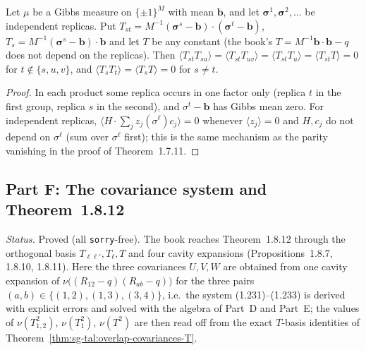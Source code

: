 \begin{theorem}
\label{thm:sg-tal:T-orthogonality}
  \leanok
{}
Let $\mu$ be a Gibbs measure on $\{\pm1\}^M$ with mean $\mathbf b$, and let $\boldsymbol\sigma^1,\boldsymbol\sigma^2,\dots$ be independent replicas.  Put $T_{st}=M^{-1}(\boldsymbol\sigma^s-\mathbf b)\cdot(\boldsymbol\sigma^t-\mathbf b)$, $T_s=M^{-1}(\boldsymbol\sigma^s-\mathbf b)\cdot\mathbf b$ and let $T$ be any constant (the book's $T=M^{-1}\mathbf b\cdot\mathbf b-q$ does not depend on the replicas).  Then
$\langle T_{st}T_{su}\rangle=\langle T_{st}T_{uv}\rangle=\langle T_{st}T_u\rangle=\langle T_{st}T\rangle=0$ for $t\notin\{s,u,v\}$, and $\langle T_sT_t\rangle=\langle T_sT\rangle=0$ for $s\ne t$.
\end{theorem}
\begin{proof}
  \leanok
In each product some replica occurs in one factor only (replica $t$ in the first group, replica $s$ in the second), and $\sigma^t-\mathbf b$ has Gibbs mean zero.  For independent replicas, $\langle H\cdot\sum_j z_j(\sigma^\ell)c_j\rangle=0$ whenever $\langle z_j\rangle=0$ and $H,c_j$ do not depend on $\sigma^\ell$ (sum over $\sigma^\ell$ first); this is the same mechanism as the parity vanishing in the proof of Theorem~1.7.11.
\end{proof}

\subsection{Part F: The covariance system and Theorem~1.8.12}

\emph{Status.}  Proved (all \texttt{sorry}-free).  The book reaches Theorem~1.8.12 through the
orthogonal basis $T_{\ell\ell'},T_\ell,T$ and four cavity expansions (Propositions~1.8.7, 1.8.10,
1.8.11).  Here the three covariances $U,V,W$ are obtained from one cavity expansion of
$\nu\bigl((R_{12}-q)(R_{ab}-q)\bigr)$ for the three pairs $(a,b)\in\{(1,2),(1,3),(3,4)\}$, i.e.\ the
system (1.231)--(1.233) is derived with explicit errors and solved with the algebra of Part~D and
Part~E; the values of $\nu(T_{1,2}^2)$, $\nu(T_1^2)$, $\nu(T^2)$ are then read off from the exact
$T$-basis identities of Theorem~\ref{thm:sg-tal:overlap-covariances-T}.

